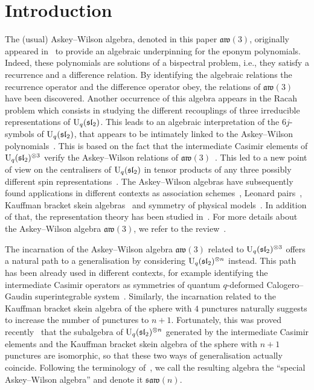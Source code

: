 \documentclass[pdftex]{sigma}
\numberwithin{equation}{section}
\theoremstyle{definition}
\newcommand{\saw}{\mathfrak{saw}(n)}
\begin{document}


\section{Introduction}

The (usual) Askey--Wilson algebra, denoted in this paper $\mathfrak{aw}(3)$, originally appeared in~\cite{Zh} to provide an algebraic
underpinning for the eponym polynomials. Indeed, these polynomials are solutions of a bispectral problem, i.e., they satisfy a recurrence and a difference relation.
By identifying the algebraic relations the recurrence operator and the difference operator obey, the relations of $\mathfrak{aw}(3)$ have been discovered.
Another occurrence of this algebra appears in the Racah problem which consists in studying the different recouplings of three irreducible representations of ${\rm U}_q(\mathfrak{sl}_2)$. This leads to an algebraic interpretation of the $6j$-symbols of ${\rm U}_q(\mathfrak{sl}_2)$, that appears to be intimately linked to the Askey–Wilson polynomials~\cite{Zh2,GZ}.
 This is based on the fact that the intermediate Casimir elements of ${\rm U}_q(\mathfrak{sl}_2)^{\otimes 3}$ verify the Askey–Wilson relations of $\mathfrak{aw}(3)$~\cite{Hua3}.
 This led to a new point of view on the centralisers of ${\rm U}_q(\mathfrak{sl}_2)$ in tensor products of any three possibly different spin representations~\cite{CPVZ, CVZ2}.
The Askey--Wilson algebras have subsequently found applications in different contexts as association schemes~\cite{BI,Leo,Ter}, Leonard pairs~\cite{TV}, Kauffman bracket skein algebras~\cite{CL}
and symmetry of physical models~\cite{GVZ, KKM,Post}. In addition of that, the representation theory has been studied in~\cite{Hua2}. For more details about the Askey--Wilson algebra $\mathfrak{aw}(3)$, we refer to the review~\cite{avatar}.

The incarnation of the Askey--Wilson algebra $\mathfrak{aw}(3)$ related to ${\rm U}_q(\mathfrak{sl}_2)^{\otimes 3}$ offers a natural path to a generalisation by considering ${\rm U}_q(\mathfrak{sl}_2)^{\otimes n}$ instead. This path has been already used in different contexts, for example identifying the intermediate Casimir operators as symmetries of quantum $q$-deformed Calogero--Gaudin superintegrable system~\cite{GIV}.
Similarly, the incarnation related to the
Kauffman bracket skein algebra of the sphere with $4$ punctures naturally suggests to increase the number of punctures to $n+1$. Fortunately, this was proved recently~\cite{CL} that the subalgebra of
${\rm U}_q(\mathfrak{sl}_2)^{\otimes n}$ generated by the intermediate Casimir elements and the Kauffman bracket skein algebra of the sphere with $n+1$ punctures
are isomorphic, so that these two ways of generalisation actually coincide. Following the terminology of~\cite{avatar}, we call the resulting algebra the ``special Askey--Wilson algebra'' and denote it $\saw$.
\end{document}
